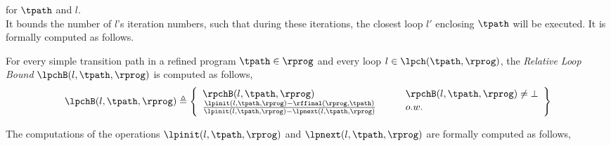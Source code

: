 \begin{enumerate}
 for $\tpath$ and $l$.
\\
It bounds the number of $l$'s iteration numbers,
such that during these iterations, the closest loop $l'$ enclosing $\tpath$ will be executed.
It is formally computed as follows.
\begin{defn}
  \label{def:relatedloop_bound}
For every simple transition path in a refined program $\tpath \in \rprog$
and every loop $l \in \lpch(\tpath, \rprog)$,
the \emph{Relative Loop Bound} $\lpchB(l, \tpath, \rprog)$ is computed as follows,
\[
  \lpchB(l, \tpath, \rprog) \triangleq
  \left\{
  \begin{array}{ll}
    \rpchB(l, \tpath, \rprog)  
    & \qquad \rpchB(l, \tpath, \rprog) \neq \bot
    \\
    \frac{\lpinit(l, \tpath, \rprog) - \rffinal(\rprog, \tpath)}{\lpinit(l, \tpath, \rprog) - \lpnext(l, \tpath, \rprog)}
    & \qquad o.w.
  \end{array}
  \right\}
  \]
\end{defn}
The computations of the operations $\lpinit(l, \tpath, \rprog)$ and $\lpnext(l, \tpath, \rprog)$
are formally computed as follows,
\begin{itemize}


\end{itemize}
\end{enumerate}
